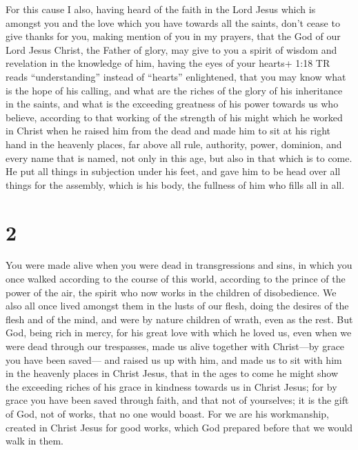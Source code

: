 For this cause I also, having heard of the faith in the
Lord Jesus which is amongst you and the love which you have towards all
the saints,  don't cease to give thanks for you, making
mention of you in my prayers,  that the God of our Lord
Jesus Christ, the Father of glory, may give to you a spirit of wisdom
and revelation in the knowledge of him,  having the eyes of
your hearts+ 1:18 TR reads ``understanding'' instead of ``hearts''
enlightened, that you may know what is the hope of his calling, and what
are the riches of the glory of his inheritance in the saints,
 and what is the exceeding greatness of his power towards
us who believe, according to that working of the strength of his might
 which he worked in Christ when he raised him from the dead
and made him to sit at his right hand in the heavenly places,
 far above all rule, authority, power, dominion, and every
name that is named, not only in this age, but also in that which is to
come.  He put all things in subjection under his feet, and
gave him to be head over all things for the assembly, 
which is his body, the fullness of him who fills all in all.

\hypertarget{section-1}{%
\section{2}\label{section-1}}

 You were made alive when you were dead in transgressions
and sins,  in which you once walked according to the course
of this world, according to the prince of the power of the air, the
spirit who now works in the children of disobedience.  We
also all once lived amongst them in the lusts of our flesh, doing the
desires of the flesh and of the mind, and were by nature children of
wrath, even as the rest.  But God, being rich in mercy, for
his great love with which he loved us,  even when we were
dead through our trespasses, made us alive together with Christ---by
grace you have been saved---  and raised us up with him, and
made us to sit with him in the heavenly places in Christ Jesus,
 that in the ages to come he might show the exceeding riches
of his grace in kindness towards us in Christ Jesus;  for by
grace you have been saved through faith, and that not of yourselves; it
is the gift of God,  not of works, that no one would boast.
 For we are his workmanship, created in Christ Jesus for
good works, which God prepared before that we would walk in them.

